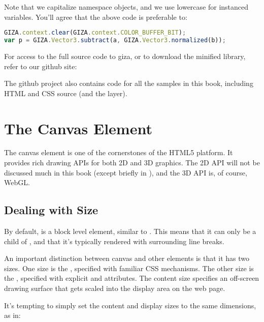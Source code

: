 Note that we capitalize namespace objects, and we use lowercase for instanced variables.  You'll agree that the above code is preferable to:

\begin{lstlisting}[language=JavaScript]
GIZA.context.clear(GIZA.context.COLOR_BUFFER_BIT);
var p = GIZA.Vector3.subtract(a, GIZA.Vector3.normalized(b));
\end{lstlisting}

For access to the full source code to giza, or to download the minified library, refer to our github site:


The github project also contains code for all the samples in this book, including HTML and CSS source (and the  layer).

\section{The Canvas Element}

The canvas element  is one of the cornerstones of the HTML5 platform.  It provides rich drawing APIs for both 2D and 3D graphics.  The 2D API will not be discussed much in this book (except briefly in ), and the 3D API is, of course, WebGL.

\subsection{Dealing with Size}

By default,  is a block level element, similar to .  This means that it can only be a child of , and that it's typically rendered with surrounding line breaks.

An important distinction between canvas and other elements is that it has two  sizes.  One size is the , specified with familiar  CSS mechanisms.  The other size is the , specified with explicit   and   attributes.  The content size specifies an off-screen drawing surface that gets scaled into the display area on the web page.

It's tempting to simply set the content and display sizes to the same dimensions, as in:

